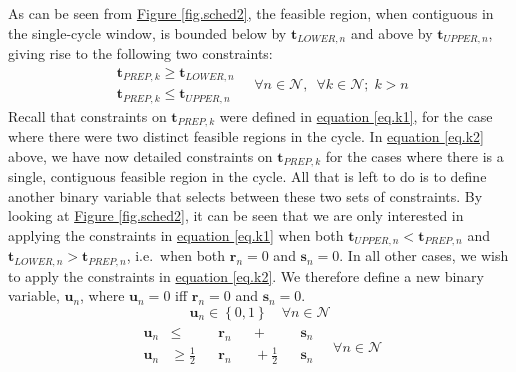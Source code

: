 As can be seen from \hyperref[fig.sched2]{Figure \ref*{fig.sched2}},
the feasible region, when contiguous in the single-cycle window,
is bounded below by $\boldsymbol{t}_{\mathit{LOWER},n}$ and above by
$\boldsymbol{t}_{\mathit{UPPER},n}$, giving rise to the following two
constraints:
\begin{equation}
    \begin{split}
        \boldsymbol{t}_{\mathit{PREP},k} 
        \ge \boldsymbol{t}_{\mathit{LOWER},n}\\
        \boldsymbol{t}_{\mathit{PREP},k} 
        \le \boldsymbol{t}_{\mathit{UPPER},n}
    \end{split}
    \quad \forall n \in \mathcal{N}, \enspace \forall k \in \mathcal{N}; \;
    k > n
    \label{eq.k2}
\end{equation}
Recall that constraints on $\boldsymbol{t}_{\mathit{PREP},k}$ were defined in
\hyperref[eq.k1]{equation \ref*{eq.k1}}, for the case where there were two
distinct feasible regions in the cycle.
In \hyperref[eq.k2]{equation \ref*{eq.k2}} above, we have now detailed
constraints on $\boldsymbol{t}_{\mathit{PREP},k}$ for the cases where there is
a single, contiguous feasible region in the cycle.
All that is left to do is to define another binary variable that selects
between these two sets of constraints.
By looking at \hyperref[fig.sched2]{Figure \ref*{fig.sched2}}, it can be seen
that we are only interested in applying the constraints in 
\hyperref[eq.k1]{equation \ref*{eq.k1}} when both
$\boldsymbol{t}_{\mathit{UPPER},n} < \boldsymbol{t}_{\mathit{PREP},n}$ and
$\boldsymbol{t}_{\mathit{LOWER},n} > \boldsymbol{t}_{\mathit{PREP},n}$, i.e.\
when both $\boldsymbol{r}_{n} = 0$ and $\boldsymbol{s}_{n} = 0$.
In all other cases, we wish to apply the constraints in
\hyperref[eq.k2]{equation \ref*{eq.k2}}.
We therefore define a new binary variable, $\boldsymbol{u}_{n}$, where 
$\boldsymbol{u}_{n} = 0$ iff $\boldsymbol{r}_{n} = 0$ and 
$\boldsymbol{s}_{n} = 0$.
\begin{equation}
    \boldsymbol{u}_{n} \in \left\{ 0, 1 \right\} \quad \forall n \in
    \mathcal{N}
    \label{eq.u}
\end{equation}
\begin{equation}
    \begin{split}
        \begin{alignedat}{8}
            \boldsymbol{u}_{n} &\le &&\boldsymbol{r}_{n}
            && {}+{} &&\boldsymbol{s}_{n}\\
            \boldsymbol{u}_{n} &\ge \tfrac{1}{2} &&\boldsymbol{r}_{n}
            && {}+{} \tfrac{1}{2} &&\boldsymbol{s}_{n}\\
        \end{alignedat}
        \quad \forall n \in \mathcal{N}
    \end{split}
    \label{eq.u1}
\end{equation}
